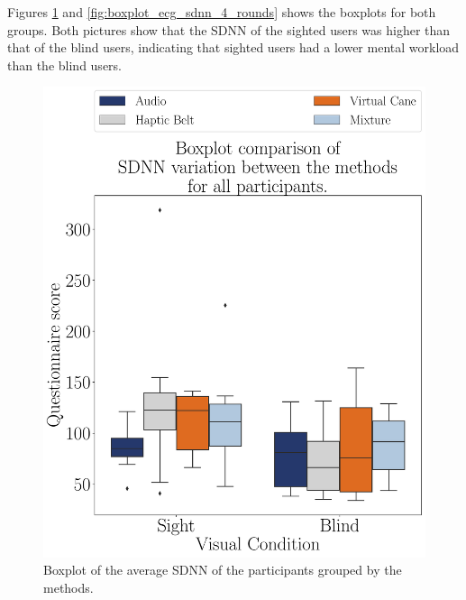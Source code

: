
Figures \ref{fig:boxplot_ecg_sdnn_4_scene} and \ref{fig:boxplot_ecg_sdnn_4_rounds} shows the boxplots for both groups. Both pictures show that the SDNN of the sighted users was higher than that of the blind users, indicating that sighted users had a lower mental workload than the blind users.

\begin{figure}[!htb]
    \centering
    \includegraphics[width = 0.75\linewidth]{Resultados/ECG/Figuras/pdf/boxplot_ecg_sdnn_4_scene.pdf}
    \caption{Boxplot of the average SDNN of the participants grouped by the methods.}
    \label{fig:boxplot_ecg_sdnn_4_scene}
\end{figure}

